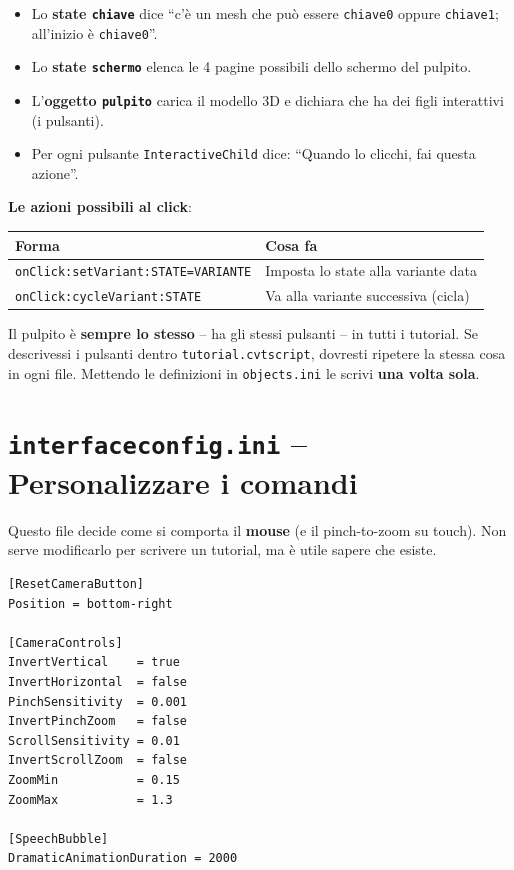 ﻿\documentclass[a4paper,12pt,oneside]{book}
\newcommand{\kw}[1]{\texttt{\color{keycolor}#1}}
\newcommand{\val}[1]{\texttt{\color{cvtgreen}#1}}
\newcommand{\file}[1]{\texttt{#1}}
\begin{document}
\begin{itemize}
  \item Lo \textbf{state \texttt{chiave}} dice ``c'è un mesh che può essere
        \texttt{chiave0} oppure \texttt{chiave1}; all'inizio è
        \texttt{chiave0}''.
  \item Lo \textbf{state \texttt{schermo}} elenca le 4 pagine possibili dello
        schermo del pulpito.
  \item L'\textbf{oggetto \texttt{pulpito}} carica il modello 3D e dichiara che
        ha dei figli interattivi (i pulsanti).
  \item Per ogni pulsante \kw{InteractiveChild} dice: ``Quando lo clicchi, fai
        questa azione''.
\end{itemize}

\textbf{Le azioni possibili al click}:

\begin{longtable}{@{}lp{10cm}@{}}
\toprule
\textbf{Forma} & \textbf{Cosa fa} \\
\midrule
\val{onClick:setVariant:STATE=VARIANTE} & Imposta lo state alla variante data \\
\val{onClick:cycleVariant:STATE} & Va alla variante successiva (cicla) \\
\bottomrule
\end{longtable}

\begin{notablu}
Il pulpito è \textbf{sempre lo stesso} -- ha gli stessi pulsanti -- in tutti i
tutorial. Se descrivessi i pulsanti dentro \file{tutorial.cvtscript}, dovresti
ripetere la stessa cosa in ogni file. Mettendo le definizioni in
\file{objects.ini} le scrivi \textbf{una volta sola}.
\end{notablu}

\section{\texttt{interfaceconfig.ini} -- Personalizzare i comandi}

Questo file decide come si comporta il \textbf{mouse} (e il pinch-to-zoom su
touch). Non serve modificarlo per scrivere un tutorial, ma è utile sapere che
esiste.

\begin{esempiocvt}
\begin{lstlisting}
[ResetCameraButton]
Position = bottom-right

[CameraControls]
InvertVertical    = true
InvertHorizontal  = false
PinchSensitivity  = 0.001
InvertPinchZoom   = false
ScrollSensitivity = 0.01
InvertScrollZoom  = false
ZoomMin           = 0.15
ZoomMax           = 1.3

[SpeechBubble]
DramaticAnimationDuration = 2000
\end{lstlisting}
\end{esempiocvt}
\end{document}
